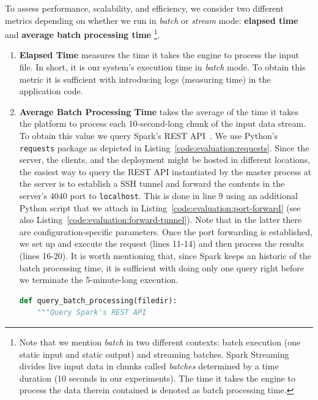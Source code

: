To assess performance, scalability, and efficiency, we consider two different metrics depending on whether we run in \emph{batch} or \emph{stream} mode: \textbf{elapsed time} and \textbf{average batch processing time}
\footnote{
Note that we mention \textit{batch} in two different contexts: batch execution (one static input and static output) and streaming batches.
Spark Streaming divides live input data in chunks called \emph{batches} determined by a time duration (10 seconds in our experiments).
The time it takes the engine to process the data therein contained is denoted as batch processing time.}.
\begin{enumerate}
    \item \textbf{Elapsed Time} measures the time it takes the engine to process the input file. In short, it is our system's execution time in \emph{batch} mode. To obtain this metric it is sufficient with introducing logs (measuring time) in the application code.
    \item \textbf{Average Batch Processing Time} takes the average of the time it takes the platform to process each 10-second-long chunk of the input data stream. To obtain this value we query Spark's REST API~\cite{spark-rest-api}. We use Python's \texttt{requests} package as depicted in Listing~\ref{code:evaluation:requests}. Since the server, the clients, and the deployment might be hosted in different locations, the easiest way to query the REST API instantiated by the master process at the server is to establish a SSH tunnel and forward the contents in the server's $4040$ port to \texttt{localhost}. This is done in line 9 using an additional Python script that we attach in Listing~\ref{code:evaluation:port-forward} (see also Listing~\ref{code:evaluation:forward-tunnel}). Note that in the latter there are configuration-specific parameters. Once the port forwarding is established, we set up and execute the request (lines 11-14) and then process the results (lines 16-20). It is worth mentioning that, since Spark keeps an historic of the batch processing time, it is sufficient with doing only one query right before we terminate the 5-minute-long execution.
\begin{lstlisting}[language=Python,caption={Snippet illustrating a query to Spark's REST API.},label=code:evaluation:requests]
def query_batch_processing(filedir):
    """Query Spark's REST API 


\end{lstlisting}
\end{enumerate}
